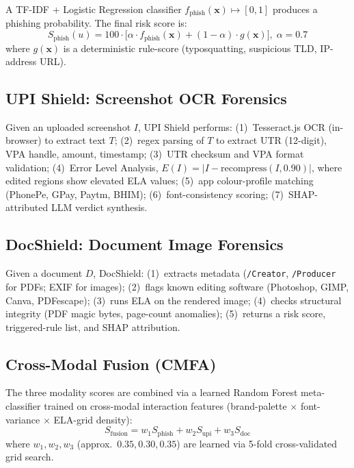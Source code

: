 \documentclass[conference]{IEEEtran}
\begin{document}
\vspace{2mm}

A TF-IDF + Logistic Regression classifier
$f_{\text{phish}}(\mathbf{x})\!\mapsto\![0,1]$ produces a phishing
probability. The final risk score is:
\begin{equation}
S_{\text{phish}}(u) = 100\cdot\bigl[\alpha\cdot f_{\text{phish}}(\mathbf{x}) + (1{-}\alpha)\cdot g(\mathbf{x})\bigr],\; \alpha{=}0.7
\end{equation}
where $g(\mathbf{x})$ is a deterministic rule-score (typosquatting,
suspicious TLD, IP-address URL).

\subsection{UPI Shield: Screenshot OCR Forensics}
\vspace{2mm}
Given an uploaded screenshot $I$, UPI Shield performs: (1)~Tesseract.js
OCR (in-browser) to extract text $T$; (2)~regex parsing of $T$ to
extract UTR (12-digit), VPA handle, amount, timestamp;
(3)~UTR checksum and VPA format validation; (4)~Error Level Analysis,
$E(I) = |I - \mathrm{recompress}(I, 0.90)|$, where edited regions show
elevated ELA values; (5)~app colour-profile matching (PhonePe, GPay,
Paytm, BHIM); (6)~font-consistency scoring; (7)~SHAP-attributed LLM
verdict synthesis.

\subsection{DocShield: Document Image Forensics}
\vspace{2mm}
Given a document $D$, DocShield: (1)~extracts metadata
(\texttt{/Creator}, \texttt{/Producer} for PDFs; EXIF for images);
(2)~flags known editing software (Photoshop, GIMP, Canva, PDFescape);
(3)~runs ELA on the rendered image; (4)~checks structural integrity
(PDF magic bytes, page-count anomalies); (5)~returns a risk score,
triggered-rule list, and SHAP attribution.

\subsection{Cross-Modal Fusion (CMFA)}
\vspace{2mm}
The three modality scores are combined via a learned Random Forest
meta-classifier trained on cross-modal interaction features
(brand-palette $\times$ font-variance $\times$ ELA-grid density):
\begin{equation}
S_{\text{fusion}} = w_1 S_{\text{phish}} + w_2 S_{\text{upi}} + w_3 S_{\text{doc}}
\end{equation}
where $w_1, w_2, w_3$ (approx.\ $0.35, 0.30, 0.35$) are learned via
5-fold cross-validated grid search.
\end{document}
